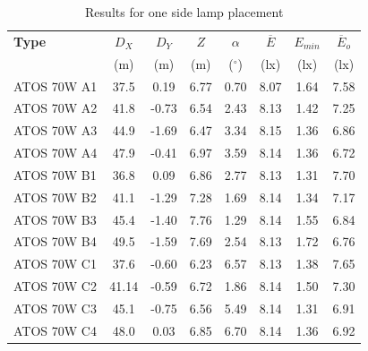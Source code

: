 \begin{table}[htb]
	\renewcommand{\arraystretch}{1.3}
	\caption{Results for one side lamp placement}
 	\label{tab:onesideLamps}
	\centering
  \begin{tabular}{ l | c | c | c | c | c | c | c }
    \hline
    \textbf{Type} & $D_X$ & $D_Y$ & $Z$ & $\alpha$ & $\overline{E}$ & $E_{min}$ & $\overline{E}_o$\\ 
    & (m) & (m) & (m) & ($^\circ$) & (lx) & (lx) & (lx)\\ \hline
    ATOS 70W A1 & 37.5 & 0.19 & 6.77 & 0.70 & 8.07 & 1.64 & 7.58 \\ \hline
    ATOS 70W A2 & 41.8 & -0.73 & 6.54 & 2.43 & 8.13 & 1.42 & 7.25\\ \hline
    ATOS 70W A3 & 44.9 & -1.69 & 6.47 & 3.34 & 8.15 & 1.36 & 6.86\\ \hline
    ATOS 70W A4 & 47.9 & -0.41 & 6.97 & 3.59 & 8.14 & 1.36 & 6.72\\ \hline\hline
    ATOS 70W B1 & 36.8 & 0.09 & 6.86 & 2.77 & 8.13 & 1.31 & 7.70\\ \hline
    ATOS 70W B2 & 41.1 & -1.29 & 7.28 & 1.69 & 8.14 & 1.34 & 7.17\\ \hline
    ATOS 70W B3 & 45.4 & -1.40 & 7.76 & 1.29 & 8.14 & 1.55 & 6.84\\ \hline
    ATOS 70W B4 & 49.5 & -1.59 & 7.69 & 2.54 & 8.13 & 1.72 & 6.76\\ \hline\hline
    ATOS 70W C1 & 37.6 & -0.60 & 6.23 & 6.57 & 8.13 & 1.38 & 7.65\\ \hline
    ATOS 70W C2 & 41.14 & -0.59 & 6.72 & 1.86 & 8.14 & 1.50 & 7.30\\ \hline
    ATOS 70W C3 & 45.1 & -0.75 & 6.56 & 5.49 & 8.14 & 1.31 & 6.91\\ \hline
    ATOS 70W C4 & 48.0 & 0.03 & 6.85 & 6.70 & 8.14 & 1.36 & 6.92\\ \hline
  \end{tabular}
\end{table}

